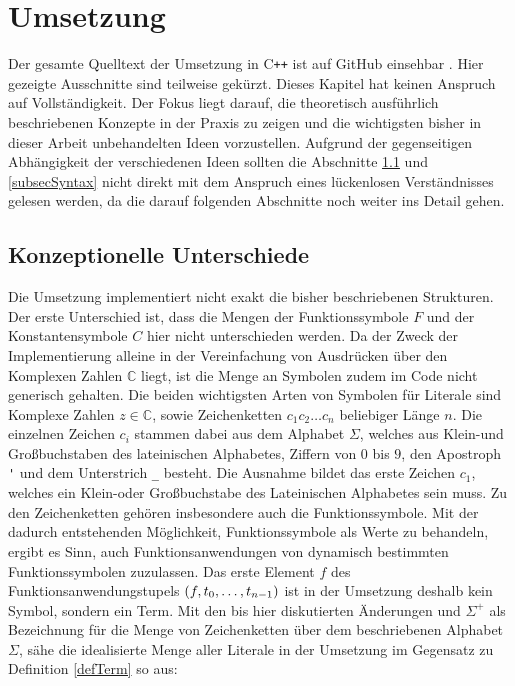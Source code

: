 

\chapter{Umsetzung} \label{secKernUmsetzungInCpp}

Der gesamte Quelltext der Umsetzung in C\texttt{++} ist auf GitHub einsehbar \cite{brunizzl2021Jul}. Hier gezeigte Ausschnitte sind teilweise gekürzt.
Dieses Kapitel hat keinen Anspruch auf Vollständigkeit. Der Fokus liegt darauf, die theoretisch ausführlich beschriebenen Konzepte in der Praxis zu zeigen und die wichtigsten bisher in dieser Arbeit unbehandelten Ideen vorzustellen. Aufgrund der gegenseitigen Abhängigkeit der verschiedenen Ideen sollten die Abschnitte \ref{subsecKonzeptionelleUnterschiede} und \ref{subsecSyntax} nicht direkt mit dem Anspruch eines lückenlosen Verständnisses gelesen werden, da die darauf folgenden Abschnitte noch weiter ins Detail gehen.

\section{Konzeptionelle Unterschiede} \label{subsecKonzeptionelleUnterschiede}
Die Umsetzung implementiert nicht exakt die bisher beschriebenen Strukturen. Der erste Unterschied ist, dass die Mengen der Funktionssymbole $F$ und der Konstantensymbole $C$ hier nicht unterschieden werden. Da der Zweck der Implementierung alleine in der Vereinfachung von Ausdrücken über den Komplexen Zahlen $\mathbb C$ liegt, ist die Menge an Symbolen zudem im Code nicht generisch gehalten. Die beiden wichtigsten Arten von Symbolen für Literale sind Komplexe Zahlen $z \in \mathbb C$, sowie Zeichenketten $c_1 c_2\dots c_n$ beliebiger Länge $n$. Die einzelnen Zeichen $c_i$ stammen dabei aus dem Alphabet $\Sigma$, welches aus Klein-und Großbuchstaben des lateinischen Alphabetes, Ziffern von $0$ bis $9$, den Apostroph \verb|'| und dem Unterstrich \verb|_| besteht. Die Ausnahme bildet das erste Zeichen $c_1$, welches ein Klein-oder Großbuchstabe des Lateinischen Alphabetes sein muss. Zu den Zeichenketten gehören insbesondere auch die Funktionssymbole. Mit der dadurch entstehenden Möglichkeit, Funktionssymbole als Werte zu behandeln, ergibt es Sinn, auch Funktionsanwendungen von dynamisch bestimmten Funktionssymbolen zuzulassen. Das erste Element $f$ des Funktionsanwendungstupels $(f, {t}_{0}, \dots, {t}_{n-1})$ ist in der Umsetzung deshalb kein Symbol, sondern ein Term. Mit den bis hier diskutierten Änderungen und $\Sigma^+$ als Bezeichnung für die Menge von Zeichenketten über dem beschriebenen Alphabet $\Sigma$, sähe die idealisierte Menge aller Literale in der Umsetzung im Gegensatz zu Definition \ref{defTerm} so aus:

